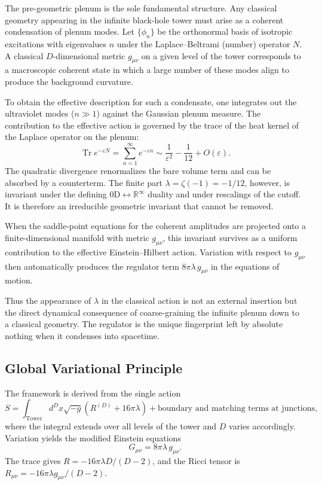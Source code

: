 \documentclass[11pt,a4paper,oneside]{article}
\begin{document}
The pre-geometric plenum is the sole fundamental structure. Any classical geometry appearing in the infinite black-hole tower must arise as a coherent condensation of plenum modes. Let \(\{\phi_n\}\) be the orthonormal basis of isotropic excitations with eigenvalues \(n\) under the Laplace--Beltrami (number) operator \(N\). A classical \(D\)-dimensional metric \(g_{\mu\nu}\) on a given level of the tower corresponds to a macroscopic coherent state in which a large number of these modes align to produce the background curvature.

To obtain the effective description for such a condensate, one integrates out the ultraviolet modes (\(n \gg 1\)) against the Gaussian plenum measure. The contribution to the effective action is governed by the trace of the heat kernel of the Laplace operator on the plenum:
\[
\operatorname{Tr} e^{-\varepsilon N} = \sum_{n=1}^\infty e^{-\varepsilon n} \sim \frac{1}{\varepsilon^2} - \frac{1}{12} + O(\varepsilon).
\]
The quadratic divergence renormalizes the bare volume term and can be absorbed by a counterterm. The finite part \(\lambda = \zeta(-1) = -1/12\), however, is invariant under the defining \(0\mathrm{D} \leftrightarrow \mathbb{R}^\infty\) duality and under rescalings of the cutoff. It is therefore an irreducible geometric invariant that cannot be removed.

When the saddle-point equations for the coherent amplitudes are projected onto a finite-dimensional manifold with metric \(g_{\mu\nu}\), this invariant survives as a uniform contribution to the effective Einstein--Hilbert action. Variation with respect to \(g_{\mu\nu}\) then automatically produces the regulator term \(8\pi\lambda \, g_{\mu\nu}\) in the equations of motion. 

Thus the appearance of \(\lambda\) in the classical action is not an external insertion but the direct dynamical consequence of coarse-graining the infinite plenum down to a classical geometry. The regulator is the unique fingerprint left by absolute nothing when it condenses into spacetime.

\subsection{Global Variational Principle}
The framework is derived from the single action
\[
S = \int_{\text{Tower}} d^D x \sqrt{-g} \left( R^{(D)} + 16\pi \lambda \right) + \text{boundary and matching terms at junctions},
\]
where the integral extends over all levels of the tower and $D$ varies accordingly. Variation yields the modified Einstein equations
\[
G_{\mu\nu} = 8\pi\lambda \, g_{\mu\nu}.
\]
The trace gives $R = -16\pi\lambda D/(D-2)$, and the Ricci tensor is $R_{\mu\nu} = -16\pi\lambda g_{\mu\nu}/(D-2)$.
\end{document}
